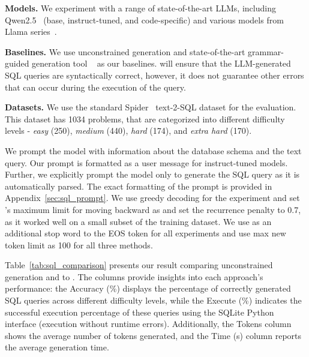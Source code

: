 

\noindent \textbf{Models.} 
We experiment with a range of state-of-the-art LLMs, including Qwen2.5~\cite{qwen2.5} (base, instruct-tuned, and code-specific) and various models from Llama series~\cite{llamamodels}.

\noindent \textbf{Baselines.}
We use \standard{} unconstrained generation and state-of-the-art grammar-guided generation tool \syncode{}~\cite{ugare2024syncodellmgenerationgrammar} as our baselines. 
\syncode{} will ensure that the LLM-generated SQL queries are syntactically correct, however, it does not guarantee other errors that can occur during the execution of the query.

\noindent \textbf{Datasets.} 
We use the standard Spider~\cite{yu-etal-2018-spider} text-2-SQL dataset for the evaluation.
This dataset has 1034 problems, that are categorized into different difficulty levels - \emph{easy} (250), \emph{medium} (440), \emph{hard} (174), and \emph{extra hard} (170).

We prompt the model with information about the database schema and the text query.
Our prompt is formatted as a user message for instruct-tuned models.
Further, we explicitly prompt the model only to generate the SQL query as it is automatically parsed.
The exact formatting of the prompt is provided in Appendix~\ref{sec:sql_prompt}.
We use greedy decoding for the experiment and set \Tool{}'s maximum limit for moving backward as  and set the \Tool{} recurrence penalty to 0.7, as it worked well on a small subset of the training dataset. 
We use  as an additional stop word to the EOS token for all experiments and use max new token limit as 100 for all three methods. 




Table~\ref{tab:sql_comparison} presents our result comparing \standard{} unconstrained generation and \syncode{} to \Tool{}. 
The columns provide insights into each approach's performance: the Accuracy (\%) displays the percentage of correctly generated SQL queries across different difficulty levels, while the Execute (\%) indicates the successful execution percentage of these queries using the SQLite Python interface (execution without runtime errors). 
Additionally, the Tokens column shows the average number of tokens generated, and the Time (s) column reports the average generation time. 

